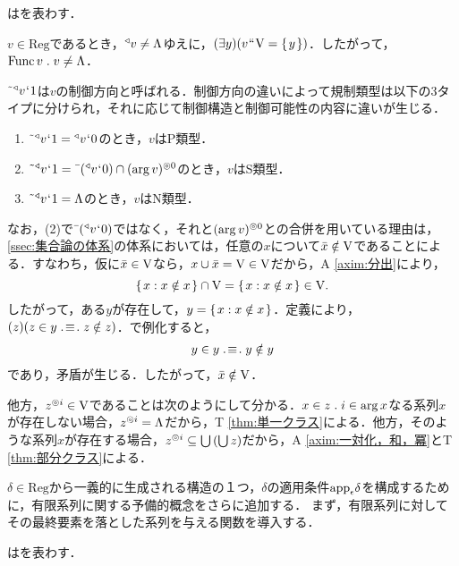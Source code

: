 \begin{df}
\label{df:規制類型}
はを表わす．
\end{df}
\noindent $v\in\mathrm{Reg}$であるとき，$ {^\triangleleft}v\neq\Lambda $ゆえに，$(\exists y)(v{\mspace{1mu}{``}\mspace{1mu}}\mathrm{V}=\{\mspace{2mu}y\mspace{2mu}\})$．したがって，$\func v\con{1}v\neq\Lambda$．

$ \tilde{\:\:}{^\triangleleft}v{\mspace{1mu}{`}\mspace{1mu}} 1 $は$v$の制御方向と呼ばれる．制御方向の違いによって規制類型は以下の3タイプに分けられ，それに応じて制御構造と制御可能性の内容に違いが生じる．
\begin{enumerate}[label=(\arabic*)]
    \item $ \tilde{\:\:}{^\triangleleft}v{\mspace{1mu}{`}\mspace{1mu}} 1 = {^\triangleleft}v{\mspace{1mu}{`}\mspace{1mu}} 0 $のとき，$v$はP類型．
    \item $ \tilde{\:\:}{^\triangleleft}v{\mspace{1mu}{`}\mspace{1mu}} 1 = \bar{\:\:}({^\triangleleft}v{\mspace{1mu}{`}\mspace{1mu}} 0)\cap(\arg v)^{\circledcirc 0} $のとき，$v$はS類型．
    \item $ \tilde{\:\:}{^\triangleleft}v{\mspace{1mu}{`}\mspace{1mu}} 1 = \Lambda $のとき，$v$はN類型．
\end{enumerate}
なお，(2)で$ \bar{\:\:}({^\triangleleft}v{\mspace{1mu}{`}\mspace{1mu}} 0) $ではなく，それと$(\arg v)^{\circledcirc 0}$との合併を用いている理由は，\ref{ssec:集合論の体系}の体系においては，任意の$x$について$\bar{x}\notin\mathrm{V}$であることによる．すなわち，仮に$ \bar{x}\in\mathrm{V} $なら，$ x\cup\bar{x} = \mathrm{V} \in\mathrm{V} $だから，A \ref{axim:分出}により，
\[
    \{\mspace{2mu}x:x\notin x\mspace{2mu}\}\cap\mathrm{V} = \{\mspace{2mu}x:x\notin x\mspace{2mu}\}\in\mathrm{V}.
\]
したがって，ある$y$が存在して，$ y = \{\mspace{2mu}x:x\notin x\mspace{2mu}\} $．定義により，$(z)(z\in y \case{3}{1}{1}z\notin z)$．で例化すると，
\begin{align*}
    y\in y \case{3}{1}{1}y\notin y
\end{align*}
であり，矛盾が生じる．したがって，$\bar{x}\notin\mathrm{V}$．

他方，$ z^{\circledcirc i}\in\mathrm{V} $であることは次のようにして分かる．$x\in z\con{1}i\in\arg x$なる系列$x$が存在しない場合，$z^{\circledcirc i}=\Lambda$だから，T \ref{thm:単一クラス}による．他方，そのような系列$x$が存在する場合，$ z^{\circledcirc i}\subseteq {\textstyle\bigcup}\mspace{3mu}({\textstyle\bigcup}\mspace{3mu}z) $だから，A \ref{axim:一対化，和，冪}とT \ref{thm:部分クラス}による．

$\delta\in\mathrm{Reg}$から一義的に生成される構造の１つ，$\delta$の適用条件$ \mathrm{app}_{\epsilon}\delta $を構成するために，有限系列に関する予備的概念をさらに追加する．
まず，有限系列に対してその最終要素を落とした系列を与える関数を導入する．
\begin{df}
\label{df:系列の最終要素を除外}
はを表わす．
\end{df}

